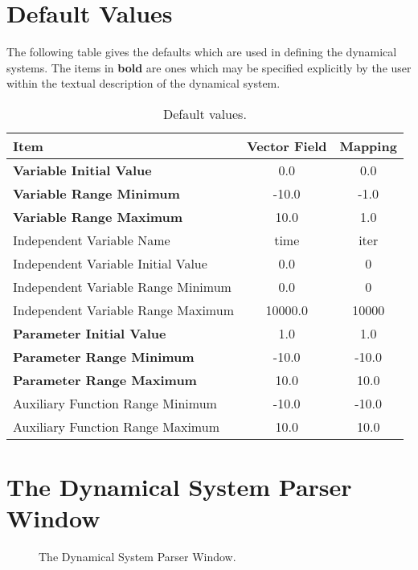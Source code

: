 \newpage
\section{Default Values}

The following table gives the defaults which are used
in defining the dynamical systems.  The items in {\bf bold}
are ones which may be specified explicitly by the user
within the textual description of the dynamical system.

\begin{table}[h]
\begin{center}
\begin{tabular}{|l|c|c|} \hline
Item & Vector Field & Mapping \\ \hline \hline
{\bf Variable Initial Value} 	& 0.0 	& 0.0 \\
{\bf Variable Range Minimum}	& -10.0	& -1.0 \\
{\bf Variable Range Maximum}	& 10.0 	& 1.0 \\ \hline
Independent Variable Name & time & iter \\
Independent Variable Initial Value & 0.0 & 0 \\
Independent Variable Range Minimum & 0.0 & 0 \\
Independent Variable Range Maximum & 10000.0 & 10000 \\ \hline
{\bf Parameter Initial Value}	& 1.0	& 1.0 \\
{\bf Parameter Range Minimum}	& -10.0	& -10.0 \\
{\bf Parameter Range Maximum}	& 10.0	& 10.0 \\ \hline
Auxiliary Function Range Minimum & -10.0 & -10.0 \\
Auxiliary Function Range Maximum & 10.0 & 10.0 \\ \hline
\end{tabular}
\end{center}
\caption{Default values.}
\label{parser_defaults}
\end{table}


\newpage
\section{The Dynamical System Parser Window}
%
%
%
\begin{figure}[h]
\vspace{.5in}
\centerline{}
\caption{\label{parser}
The Dynamical System Parser Window.
}
\end{figure}

